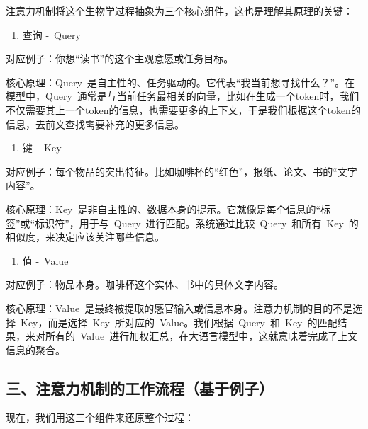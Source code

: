 注意力机制将这个生物学过程抽象为三个核心组件，这也是理解其原理的关键：

\begin{enumerate}
\def\labelenumi{\arabic{enumi}.}
\tightlist
\item
  查询 -~Query
\end{enumerate}

对应例子：你想``读书''的这个主观意愿或任务目标。

核心原理：Query~是自主性的、任务驱动的。它代表``我当前想寻找什么？''。在模型中，Query~通常是与当前任务最相关的向量，比如在生成一个token时，我们不仅需要其上一个token的信息，也需要更多的上下文，于是我们根据这个token的信息，去前文查找需要补充的更多信息。

\begin{enumerate}
\def\labelenumi{\arabic{enumi}.}
\setcounter{enumi}{1}
\tightlist
\item
  键 -~Key
\end{enumerate}

对应例子：每个物品的突出特征。比如咖啡杯的``红色''，报纸、论文、书的``文字内容''。

核心原理：Key~是非自主性的、数据本身的提示。它就像是每个信息的``标签''或``标识符''，用于与~Query~进行匹配。系统通过比较~Query~和所有~Key~的相似度，来决定应该关注哪些信息。

\begin{enumerate}
\def\labelenumi{\arabic{enumi}.}
\setcounter{enumi}{2}
\tightlist
\item
  值 -~Value
\end{enumerate}

对应例子：物品本身。咖啡杯这个实体、书中的具体文字内容。

核心原理：Value~是最终被提取的感官输入或信息本身。注意力机制的目的不是选择~Key，而是选择~Key~所对应的~Value。我们根据~Query~和~Key~的匹配结果，来对所有的~Value~进行加权汇总，在大语言模型中，这就意味着完成了上文信息的聚合。

\hypertarget{ux4e09ux6ce8ux610fux529bux673aux5236ux7684ux5de5ux4f5cux6d41ux7a0bux57faux4e8eux4f8bux5b50}{%
\subsection{三、注意力机制的工作流程（基于例子）}\label{ux4e09ux6ce8ux610fux529bux673aux5236ux7684ux5de5ux4f5cux6d41ux7a0bux57faux4e8eux4f8bux5b50}}

现在，我们用这三个组件来还原整个过程：

